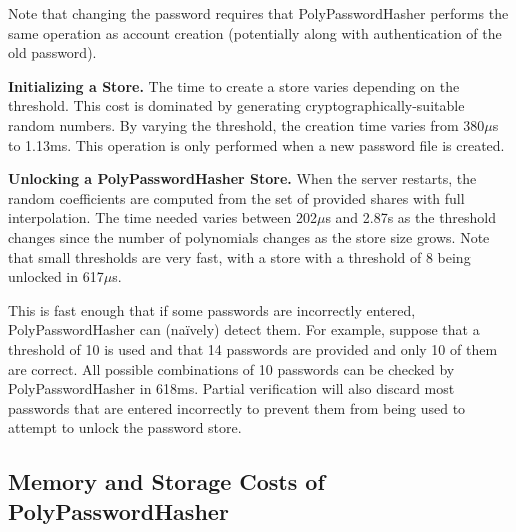 Note that changing the password requires that PolyPasswordHasher performs the same
operation as account creation (potentially along 
with authentication of the old password).


{\bf Initializing a Store.}
The time to create a store varies depending on the threshold.   This
cost is dominated by generating cryptographically-suitable random
numbers.   By varying the threshold, the creation time varies from 
380$\mu$s to 1.13ms.   This operation is only performed when a 
new password file is created.

{\bf Unlocking a PolyPasswordHasher Store.}
When the server restarts, the
random coefficients are computed from the set of provided shares with
full interpolation.   The time needed varies 
between 202$\mu$s and 2.87s as the threshold changes since
the number of polynomials changes as the store size grows.
Note that small thresholds are very fast, with a store with a threshold of 8
being unlocked in 617$\mu$s.

This is fast enough that if some passwords are incorrectly entered, 
PolyPasswordHasher can (na\"ively) detect them.   For example, suppose that
a threshold of 10 is used and that 14 passwords are provided and only
10 of them are correct.   All possible combinations of 10 passwords can be
checked by PolyPasswordHasher in 618ms.
Partial verification will also discard most passwords that are entered 
incorrectly to prevent them from being used to attempt to unlock the 
password store.




\subsection{Memory and Storage Costs of PolyPasswordHasher}


